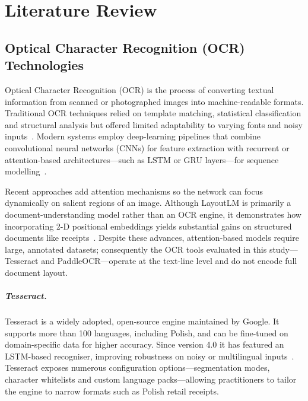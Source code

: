 \documentclass{SGGW-thesis-EN}
\begin{document}
\chapter{Literature Review}

\section{Optical Character Recognition (OCR) Technologies}

Optical Character Recognition (OCR) is the process of converting textual information
from scanned or photographed images into machine-readable formats.
Traditional OCR techniques relied on template matching, statistical classification and
structural analysis but offered limited adaptability to varying fonts and noisy inputs~\cite{ocrsystems}.
Modern systems employ deep-learning pipelines that combine convolutional neural networks
(CNNs) for feature extraction with recurrent or attention-based architectures—such as
LSTM or GRU layers—for sequence modelling~\cite{shi2016endtoend}.

Recent approaches add attention mechanisms so the network can focus dynamically on
salient regions of an image.
Although LayoutLM is primarily a document-understanding model rather than an OCR engine,
it demonstrates how incorporating 2-D positional embeddings yields substantial gains on
structured documents like receipts~\cite{li2020layoutlm}.
Despite these advances, attention-based models require large, annotated datasets;
consequently the OCR tools evaluated in this study—Tesseract and PaddleOCR—operate at the
text-line level and do not encode full document layout.

\paragraph{Tesseract.}
Tesseract is a widely adopted, open-source engine maintained by Google.
It supports more than 100 languages, including Polish, and can be fine-tuned on
domain-specific data for higher accuracy.
Since version 4.0 it has featured an LSTM-based recogniser, improving robustness on
noisy or multilingual inputs~\cite{smith2007overview,smith2013history}.
Tesseract exposes numerous configuration options—segmentation modes, character
whitelists and custom language packs—allowing practitioners to tailor the engine to
narrow formats such as Polish retail receipts.
\end{document}
